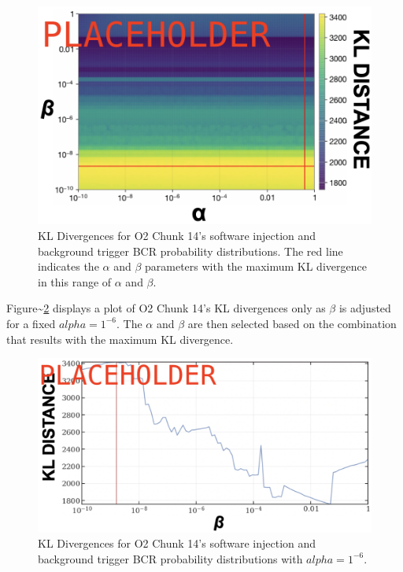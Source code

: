\documentclass[%
 reprint,
 amsmath,amssymb,
 aps,
]{revtex4}
\begin{document}
\begin{figure}[!h]

{\centering \includegraphics[width=0.75\linewidth]{images/kl_divergence_grid} 

}

\caption[KL Divergence grid for both BCR tunable parameters]{KL Divergences for O2 Chunk 14's software injection and background trigger BCR probability distributions. The red line indicates the \(\alpha\) and \(\beta\) parameters with the maximum KL divergence in this range of \(\alpha\) and \(\beta\).}\label{fig:klDivGrid}
\end{figure}

Figure\textasciitilde\ref{fig:klDivLine} displays a plot of O2 Chunk 14's KL divergences only as
\(\beta\) is adjusted for a fixed \(alpha=1^{-6}\). The \(\alpha\) and \(\beta\) are then selected
based on the combination that results with the maximum KL divergence.



\begin{figure}[!h]

{\centering \includegraphics[width=0.75\linewidth]{images/kl_distance_14} 

}

\caption[KL Divergences for one BCR tunable parameter]{KL Divergences for O2 Chunk 14's software injection and background trigger BCR probability distributions with \(alpha=1^{-6}\).}\label{fig:klDivLine}
\end{figure}
\end{document}

